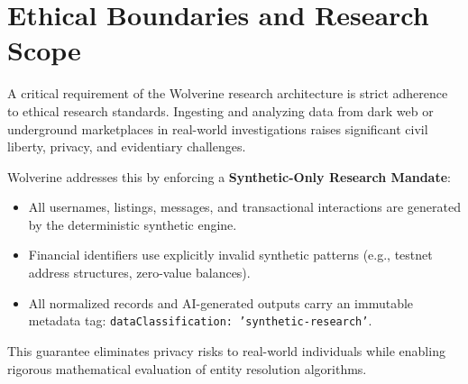 \section{Ethical Boundaries and Research Scope}
\label{sec:req-ethics}
A critical requirement of the Wolverine research architecture is strict adherence to ethical research standards. Ingesting and analyzing data from dark web or underground marketplaces in real-world investigations raises significant civil liberty, privacy, and evidentiary challenges. 

Wolverine addresses this by enforcing a \textbf{Synthetic-Only Research Mandate}:
\begin{itemize}
    \item All usernames, listings, messages, and transactional interactions are generated by the deterministic synthetic engine.
    \item Financial identifiers use explicitly invalid synthetic patterns (e.g., testnet address structures, zero-value balances).
    \item All normalized records and AI-generated outputs carry an immutable metadata tag: \texttt{dataClassification: 'synthetic-research'}.
\end{itemize}
This guarantee eliminates privacy risks to real-world individuals while enabling rigorous mathematical evaluation of entity resolution algorithms.
